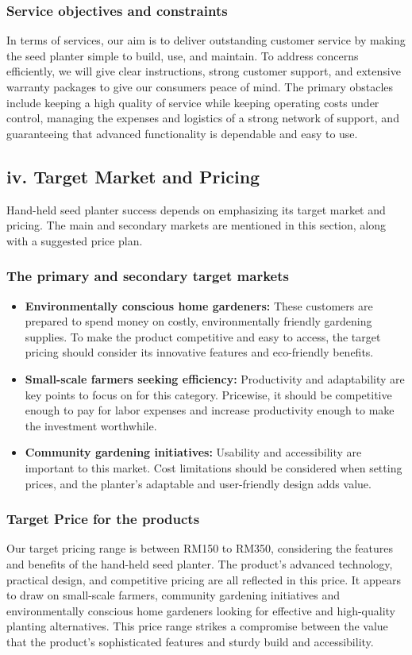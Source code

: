 \subsubsection*{Service objectives and constraints}
In terms of services, our aim is to deliver outstanding customer service by making the seed planter simple to build, use, and maintain. To address concerns efficiently, we will give clear instructions, strong customer support, and extensive warranty packages to give our consumers peace of mind. The primary obstacles include keeping a high quality of service while keeping operating costs under control, managing the expenses and logistics of a strong network of support, and guaranteeing that advanced functionality is dependable and easy to use.

\subsection*{iv. Target Market and Pricing}
Hand-held seed planter success depends on emphasizing its target market and pricing. The main and secondary markets are mentioned in this section, along with a suggested price plan.

\subsubsection*{The primary and secondary target markets}
\begin{itemize}
    \item \textbf{Environmentally conscious home gardeners:} These customers are prepared to spend money on costly, environmentally friendly gardening supplies. To make the product competitive and easy to access, the target pricing should consider its innovative features and eco-friendly benefits.
    \item \textbf{Small-scale farmers seeking efficiency:} Productivity and adaptability are key points to focus on for this category. Pricewise, it should be competitive enough to pay for labor expenses and increase productivity enough to make the investment worthwhile.
    \item \textbf{Community gardening initiatives:} Usability and accessibility are important to this market. Cost limitations should be considered when setting prices, and the planter's adaptable and user-friendly design adds value.
\end{itemize}

\subsubsection*{Target Price for the products}
Our target pricing range is between RM150 to RM350, considering the features and benefits of the hand-held seed planter. The product's advanced technology, practical design, and competitive pricing are all reflected in this price. It appears to draw on small-scale farmers, community gardening initiatives and environmentally conscious home gardeners looking for effective and high-quality planting alternatives. This price range strikes a compromise between the value that the product's sophisticated features and sturdy build and accessibility.

